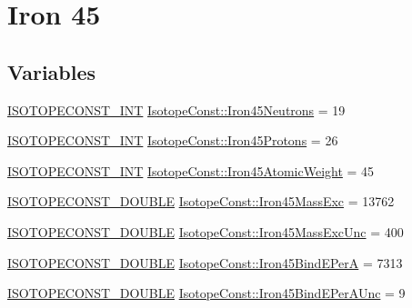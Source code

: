 \hypertarget{group___isotope_const-_iron-_fe45}{}\section{Iron 45}
\label{group___isotope_const-_iron-_fe45}
\subsection*{Variables}
\begin{DoxyCompactItemize}
\item 
\mbox{\hyperlink{group___isotope_const-_macros_ga5f18360b3e99483a35c32d789e62621c}{I\+S\+O\+T\+O\+P\+E\+C\+O\+N\+S\+T\+\_\+\+I\+NT}} \mbox{\hyperlink{group___isotope_const-_iron-_fe45_ga8ddc54238f20ccfd754e8b6bc495bd7a}{Isotope\+Const\+::\+Iron45\+Neutrons}} = 19
\item 
\mbox{\hyperlink{group___isotope_const-_macros_ga5f18360b3e99483a35c32d789e62621c}{I\+S\+O\+T\+O\+P\+E\+C\+O\+N\+S\+T\+\_\+\+I\+NT}} \mbox{\hyperlink{group___isotope_const-_iron-_fe45_gabc91f35d73974beaccc1650aa6172fd6}{Isotope\+Const\+::\+Iron45\+Protons}} = 26
\item 
\mbox{\hyperlink{group___isotope_const-_macros_ga5f18360b3e99483a35c32d789e62621c}{I\+S\+O\+T\+O\+P\+E\+C\+O\+N\+S\+T\+\_\+\+I\+NT}} \mbox{\hyperlink{group___isotope_const-_iron-_fe45_gaaaf1d9cdfec6f81596071108f7977ce9}{Isotope\+Const\+::\+Iron45\+Atomic\+Weight}} = 45
\item 
\mbox{\hyperlink{group___isotope_const-_macros_ga8f45a7272ce02c0b4c65c44636ed719a}{I\+S\+O\+T\+O\+P\+E\+C\+O\+N\+S\+T\+\_\+\+D\+O\+U\+B\+LE}} \mbox{\hyperlink{group___isotope_const-_iron-_fe45_gac70360ba4674aa4c0dd610f4a36645d8}{Isotope\+Const\+::\+Iron45\+Mass\+Exc}} = 13762
\item 
\mbox{\hyperlink{group___isotope_const-_macros_ga8f45a7272ce02c0b4c65c44636ed719a}{I\+S\+O\+T\+O\+P\+E\+C\+O\+N\+S\+T\+\_\+\+D\+O\+U\+B\+LE}} \mbox{\hyperlink{group___isotope_const-_iron-_fe45_ga0681f31eefbb7aca213a1ea76a0ae023}{Isotope\+Const\+::\+Iron45\+Mass\+Exc\+Unc}} = 400
\item 
\mbox{\hyperlink{group___isotope_const-_macros_ga8f45a7272ce02c0b4c65c44636ed719a}{I\+S\+O\+T\+O\+P\+E\+C\+O\+N\+S\+T\+\_\+\+D\+O\+U\+B\+LE}} \mbox{\hyperlink{group___isotope_const-_iron-_fe45_ga4644b292a3a838f324193fca4b959f84}{Isotope\+Const\+::\+Iron45\+Bind\+E\+PerA}} = 7313
\item 
\mbox{\hyperlink{group___isotope_const-_macros_ga8f45a7272ce02c0b4c65c44636ed719a}{I\+S\+O\+T\+O\+P\+E\+C\+O\+N\+S\+T\+\_\+\+D\+O\+U\+B\+LE}} \mbox{\hyperlink{group___isotope_const-_iron-_fe45_gafac5a0672faf2340798434a1ba17fb67}{Isotope\+Const\+::\+Iron45\+Bind\+E\+Per\+A\+Unc}} = 9

\end{DoxyCompactItemize}
